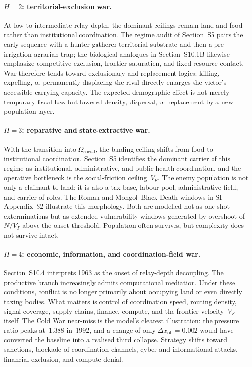 \documentclass[11pt]{article}
\begin{document}
\paragraph{$H=2$: territorial-exclusion war.}
At low-to-intermediate relay depth, the dominant ceilings remain land
and food rather than institutional coordination.  The regime audit of
Section~S5 pairs the early sequence with a hunter-gatherer territorial
substrate and then a pre-irrigation agrarian trap; the biological
analogues in Section~S10.1B likewise emphasize competitive exclusion,
frontier saturation, and fixed-resource contact.  War therefore tends
toward exclusionary and replacement logics: killing, expelling, or
permanently displacing the rival directly enlarges the victor's
accessible carrying capacity.  The expected demographic effect is not
merely temporary fiscal loss but lowered density, dispersal, or
replacement by a new population layer.

\paragraph{$H=3$: reparative and state-extractive war.}
With the transition into $\Omega_{\mathrm{social}}$, the binding
ceiling shifts from food to institutional coordination.  Section~S5
identifies the dominant carrier of this regime as institutional,
administrative, and public-health coordination, and the operative
bottleneck is the social-friction ceiling~$V_F$.  The enemy population
is not only a claimant to land; it is also a tax base, labour pool,
administrative field, and carrier of roles.  The Roman and
Mongol--Black Death windows in SI Appendix~S2 illustrate this
morphology.  Both are modelled not as one-shot exterminations but as
extended vulnerability windows generated by overshoot of~$N/V_F$ above
the onset threshold.  Population often survives, but complexity does
not survive intact.

\paragraph{$H=4$: economic, information, and coordination-field war.}
Section~S10.4 interprets 1963 as the onset of relay-depth decoupling.
The productive branch increasingly admits computational mediation.
Under these conditions, conflict is no longer primarily about occupying
land or even directly taxing bodies.  What matters is control of
coordination speed, routing density, signal coverage, supply chains,
finance, compute, and the frontier velocity~$V_F$ itself.  The Cold War
near-miss is the model's clearest illustration: the pressure ratio
peaks at~$1.388$ in~1992, and a change of only
$\Delta x_{\mathrm{off}}=0.002$ would have converted the baseline into
a realised third collapse.  Strategy shifts toward sanctions, blockade
of coordination channels, cyber and informational attacks, financial
exclusion, and compute denial.
\end{document}
